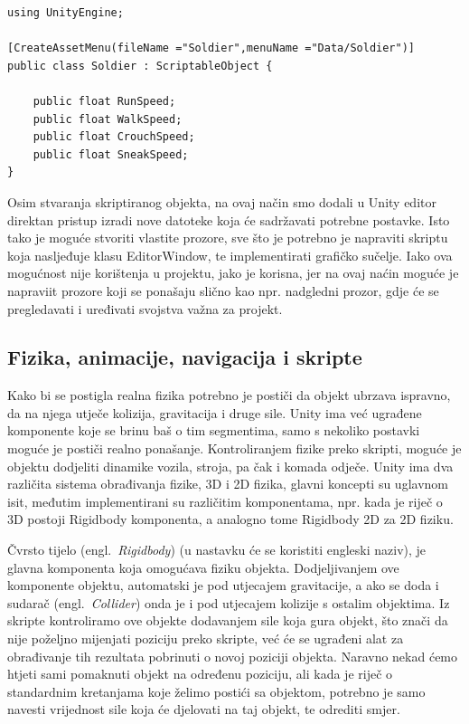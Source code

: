 \begin{lstlisting}[caption={Stvaranje skriptiranog objekta}, label=CreateScriptableObject]
using UnityEngine;

[CreateAssetMenu(fileName ="Soldier",menuName ="Data/Soldier")]
public class Soldier : ScriptableObject {

    public float RunSpeed;
    public float WalkSpeed;
    public float CrouchSpeed;
    public float SneakSpeed;
}
\end{lstlisting}

Osim stvaranja skriptiranog objekta, na ovaj način smo dodali u Unity editor direktan pristup izradi nove datoteke koja će sadržavati potrebne postavke.
Isto tako je moguće stvoriti vlastite prozore, sve što je potrebno je napraviti skriptu koja nasljeđuje klasu EditorWindow, te implementirati grafičko sučelje. Iako ova mogućnost nije korištenja u projektu, jako je korisna, jer na ovaj naćin moguće je napraviit prozore koji se ponašaju slično kao npr. nadgledni prozor, gdje će se pregledavati i uređivati svojstva važna za projekt.

\subsection{Fizika, animacije, navigacija i skripte}
Kako bi se postigla realna fizika potrebno je postiči da objekt ubrzava ispravno, da na njega utječe kolizija, gravitacija i druge sile. Unity ima već ugrađene komponente koje se brinu baš o tim segmentima, samo s nekoliko postavki moguće je postiči realno ponašanje. Kontroliranjem fizike preko skripti, moguće je objektu dodjeliti dinamike vozila, stroja, pa čak i komada odječe.
Unity ima dva različita sistema obrađivanja fizike, 3D i 2D fizika, glavni koncepti su uglavnom isit, međutim implementirani su različitim komponentama, npr. kada je riječ o 3D postoji Rigidbody komponenta, a analogno tome Rigidbody 2D za 2D fiziku.

Čvrsto tijelo (engl.~\textit{Rigidbody}) (u nastavku će se koristiti engleski naziv), je glavna komponenta koja omogućava fiziku objekta. Dodjeljivanjem ove komponente objektu, automatski je pod utjecajem gravitacije, a ako se doda i sudarač (engl.~\textit{Collider}) onda je i pod utjecajem kolizije s ostalim objektima.
Iz skripte kontroliramo ove objekte dodavanjem sile koja gura objekt, što znači da nije poželjno mijenjati poziciju preko skripte, već će se ugrađeni alat za obrađivanje tih rezultata pobrinuti o novoj poziciji objekta. Naravno nekad ćemo htjeti sami pomaknuti objekt na određenu poziciju, ali kada je riječ o standardnim kretanjama koje želimo postići sa objektom, potrebno je samo navesti vrijednost sile koja će djelovati na taj objekt, te odrediti smjer.

